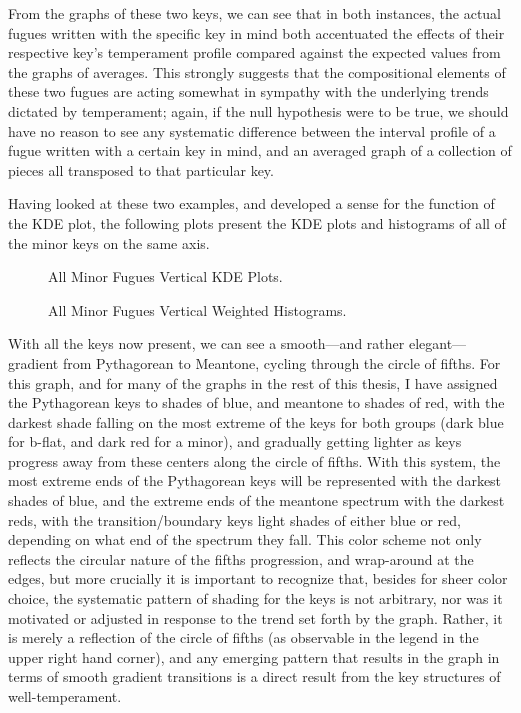 From the graphs of these two keys, we can see that in both instances,
the actual fugues written with the specific key in mind both accentuated
the effects of their respective key's temperament profile compared
against the expected values from the graphs of averages. This strongly
suggests that the compositional elements of these two fugues are acting
somewhat in sympathy with the underlying trends dictated by temperament;
again, if the null hypothesis were to be true, we should have no reason
to see any systematic difference between the interval profile of a fugue
written with a certain key in mind, and an averaged graph of a
collection of pieces all transposed to that particular key.

Having looked at these two examples, and developed a sense for the
function of the KDE plot, the following plots present the KDE plots and
histograms of all of the minor keys on the same axis.




\begin{figure}[H]
\vspace{1.5em}
    \centering
    \caption{All Minor Fugues Vertical KDE Plots.}
\end{figure}


\begin{figure}[H]
\vspace{1.5em}
    \centering
    \caption{All Minor Fugues Vertical Weighted Histograms.}
\end{figure}    With all the keys now present, we can see a smooth---and rather
elegant---gradient from Pythagorean to Meantone, cycling through the
circle of fifths. For this graph, and for many of the graphs in the rest
of this thesis, I have assigned the Pythagorean keys to shades of blue,
and meantone to shades of red, with the darkest shade falling on the
most extreme of the keys for both groups (dark blue for b-flat, and dark
red for a minor), and gradually getting lighter as keys progress away
from these centers along the circle of fifths. With this system, the
most extreme ends of the Pythagorean keys will be represented with the
darkest shades of blue, and the extreme ends of the meantone spectrum
with the darkest reds, with the transition/boundary keys light shades of
either blue or red, depending on what end of the spectrum they fall.
This color scheme not only reflects the circular nature of the fifths
progression, and wrap-around at the edges, but more crucially it is
important to recognize that, besides for sheer color choice, the
systematic pattern of shading for the keys is not arbitrary, nor was it
motivated or adjusted in response to the trend set forth by the graph.
Rather, it is merely a reflection of the circle of fifths (as observable
in the legend in the upper right hand corner), and any emerging pattern
that results in the graph in terms of smooth gradient transitions is a
direct result from the key structures of well-temperament.

